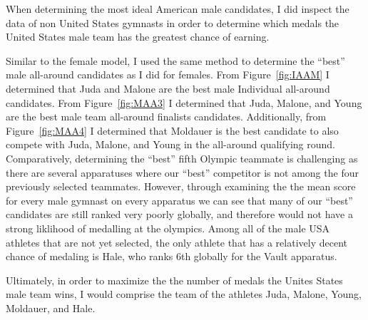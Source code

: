 \documentclass[12pt]{article}
\begin{document}
When determining the most ideal American male candidates, 
I did inspect the data of non United States gymnasts in order to determine which medals the United States 
male team has the greatest chance of earning. 

Similar to the female model, I used the same method to determine the ``best'' male all-around candidates as I did for females. From 
Figure~\ref{fig:IAAM} I determined that Juda and Malone are the best male Individual all-around candidates. From 
Figure~\ref{fig:MAA3} I determined that Juda, Malone, and Young are the best male team all-around finalists 
candidates. Additionally, from Figure~\ref{fig:MAA4} I determined that Moldauer is the best candidate to also compete 
with Juda, Malone, and Young in the all-around qualifying round. Comparatively, determining the ``best'' fifth Olympic 
teammate is challenging as there are several apparatuses where our ``best'' competitor is not among the four 
previously selected teammates. However, through examining the the mean score for every male gymnast on every apparatus 
we can see that many of our ``best'' candidates are still ranked very poorly globally, and therefore would not have a 
strong liklihood of medalling at the olympics. Among all of the male USA athletes that are not yet selected, the only 
athlete that has a relatively decent chance of medaling is Hale, who ranks 6th globally for the Vault apparatus.

Ultimately, in order to maximize the the number of medals the Unites States male team wins, I would comprise the 
team of the athletes Juda, Malone, Young, Moldauer, and Hale.



\end{document}
